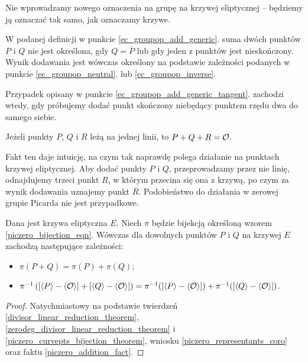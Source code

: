 \begin{remark}
Nie wprowadzamy nowego oznaczenia na grupę na krzywej eliptycznej --
będziemy ją oznaczać tak samo, jak oznaczamy krzywe.
\end{remark}

\begin{remark}
W podanej definicji w punkcie \ref{ec_groupop_add_generic}.
suma dwóch punktów $P$ i $Q$
nie jest określona, gdy $Q = \overline{P}$
lub gdy jeden z punktów jest nieskończony.
Wynik dodawania jest wówczas określony
na podstawie zależności podanych w punkcie
\ref{ec_groupop_neutral}. lub \ref{ec_groupop_inverse}.
\end{remark}

\begin{remark}
Przypadek opisany w punkcie \ref{ec_groupop_add_generic_tangent}.
zachodzi wtedy,
gdy próbujemy dodać punkt skończony niebędący punktem rzędu dwa
do samego siebie.
\end{remark}

\begin{fact}
Jeżeli punkty $P$, $Q$ i $R$ leżą na jednej linii,
to $P + Q + R = \mathcal{O}$.
\end{fact}

\noindent
Fakt ten daje intuicję, na czym tak naprawdę polega działanie
na punktach krzywej eliptycznej.
Aby dodać punkty $P$ i $Q$, przeprowadzamy przez nie linię,
odnajdujemy trzeci punkt $R$,
w którym przecina się ona z krzywą,
po czym za wynik dodawania uznajemy punkt $\overline{R}$.
Podobieństwo do działania w zerowej grupie Picarda nie jest przypadkowe.

\begin{theorem}
Dana jest krzywa eliptyczna $E$.
Niech $\pi$
będzie bijekcją określoną wzorem
\ref{piczero_bijection_eqn}.
Wówczas dla dowolnych punktów $P$ i $Q$ na krzywej $E$
zachodzą następujące zależności:
\begin{itemize}
\item $\pi(P + Q) = \pi(P) + \pi(Q)$;
\item
$\pi^{-1}\left(
[\left\langle P\right\rangle - \left\langle\mathcal{O}\right\rangle]
+
[\left\langle Q\right\rangle - \left\langle\mathcal{O}\right\rangle]\right
)
=
\pi^{-1}([\left\langle P\right\rangle - \left\langle\mathcal{O}\right\rangle])
+
\pi^{-1}([\left\langle Q\right\rangle - \left\langle\mathcal{O}\right\rangle])$.
\end{itemize}
\end{theorem}

\begin{proof}
Natychmiastowy na podstawie
twierdzeń
\ref{divisor_linear_reduction_theorem},
\ref{zerodeg_divisor_linear_reduction_theorem}
i \ref{piczero_curvepts_bijection_theorem},
wniosku \ref{piczero_representants_coro}
oraz faktu \ref{piczero_addition_fact}.
\end{proof}


